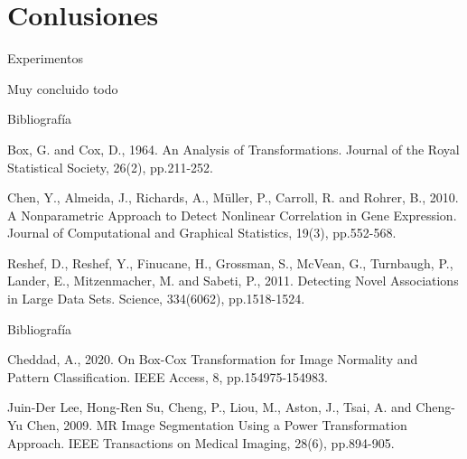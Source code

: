 \documentclass{beamer}
\begin{document}
\section{Conlusiones}

\begin{frame}{Experimentos}
    
    Muy concluido todo
\end{frame}


\begin{frame}{Bibliografía}
    \begin{thebibliography}{9}
    Box, G. and Cox, D., 1964. An Analysis of Transformations. Journal of the Royal Statistical Society, 26(2), pp.211-252.
    
    Chen, Y., Almeida, J., Richards, A., Müller, P., Carroll, R. and Rohrer, B., 2010. A Nonparametric Approach to Detect Nonlinear Correlation in Gene Expression. Journal of Computational and Graphical Statistics, 19(3), pp.552-568.
    
    Reshef, D., Reshef, Y., Finucane, H., Grossman, S., McVean, G., Turnbaugh, P., Lander, E., Mitzenmacher, M. and Sabeti, P., 2011. Detecting Novel Associations in Large Data Sets. Science, 334(6062), pp.1518-1524.
    
    \end{thebibliography}
\end{frame}

\begin{frame}{Bibliografía}
    \begin{thebibliography}{9}
    Cheddad, A., 2020. On Box-Cox Transformation for Image Normality and Pattern Classification. IEEE Access, 8, pp.154975-154983.
    
    Juin-Der Lee, Hong-Ren Su, Cheng, P., Liou, M., Aston, J., Tsai, A. and Cheng-Yu Chen, 2009. MR Image Segmentation Using a Power Transformation Approach. IEEE Transactions on Medical Imaging, 28(6), pp.894-905.
    
    \end{thebibliography}
\end{frame}
\end{document}
